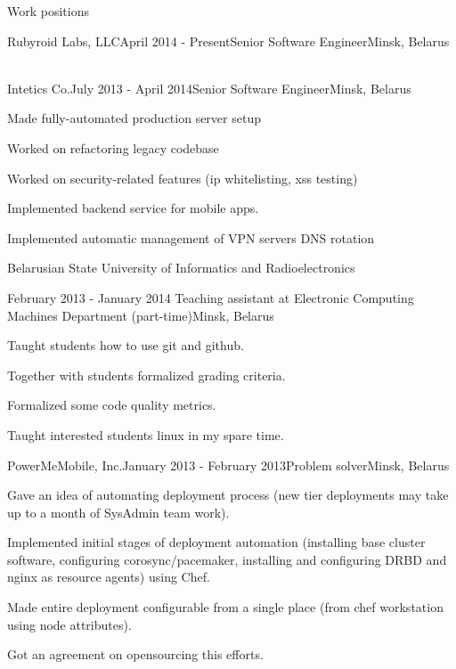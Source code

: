 \documentclass{resume} %
\begin{document}
\begin{rSection}{Work positions}

\begin{rSubsection}{Rubyroid Labs, LLC}{April 2014 - Present}{Senior Software Engineer}{Minsk, Belarus}
~
\end{rSubsection}

\begin{rSubsection}{Intetics Co.}{July 2013 - April 2014}{Senior Software Engineer}{Minsk, Belarus}
\item Made fully-automated production server setup
\item Worked on refactoring legacy codebase
\item Worked on security-related features (ip whitelisting, xss testing)
\item Implemented backend service for mobile apps.
\item Implemented automatic management of VPN servers DNS rotation
\end{rSubsection}

\begin{rSubsection}{\parbox[t][2em][t]{9cm}{Belarusian State University of Informatics and Radioelectronics}}{February 2013 - January 2014 }{Teaching assistant at Electronic Computing Machines Department (part-time)}{Minsk, Belarus}
\item Taught students how to use git and github.
\item Together with students formalized grading criteria.
\item Formalized some code quality metrics.
\item Taught interested students linux in my spare time.
\end{rSubsection}

\begin{rSubsection}{PowerMeMobile, Inc.}{January 2013 - February 2013}{Problem solver}{Minsk, Belarus}
\item Gave an idea of automating deployment process (new tier deployments may take up to
  a month of SysAdmin team work).
\item Implemented initial stages of deployment automation (installing base cluster software,
  configuring corosync/pacemaker, installing and configuring DRBD and nginx as resource agents) using Chef.
\item Made entire deployment configurable from a single place (from chef workstation using node attributes).
\item Got an agreement on opensourcing this efforts.
\end{rSubsection}


\end{rSection}
\end{document}
